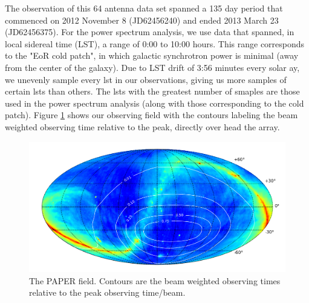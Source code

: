 \documentclass[twocolumn,numberedappendix]{emulateapj} \shorttitle{PSA64}
\begin{document}
The observation of this 64 antenna data set spanned a 135 day period that
commenced on 2012 November 8 (JD62456240) and ended  2013 March 23 (JD62456375). 
For the power spectrum analysis, we use data that spanned, in local sidereal
time (LST), a range of 0:00 to 10:00 hours. This range corresponds to
the "EoR cold patch", in which galactic synchrotron power is minimal (away from
the center of the galaxy). Due to LST drift of 3:56 minutes every solar ay, we
unevenly sample every lst in our observations, giving us more samples of certain
lsts than others. The lsts with the greatest number of smaples are those used in
the power spectrum analysis (along with those corresponding to the cold patch).
Figure \ref{fig:coverage} shows our observing field with the contours labeling
the beam weighted observing time relative to the peak, directly over head the
array.

\begin{figure}[!t]\centering
\includegraphics[width=2\columnwidth,height=\columnwidth]{plots/coverage.png}
\caption{The PAPER field. Contours are the beam weighted observing times
relative to the peak observing time/beam.}
\label{fig:coverage}
\end{figure}
\end{document}
